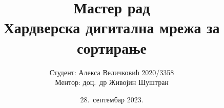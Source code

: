 
% 
% 

\documentclass{beamer}


\usepackage[utf8]{inputenc}
\usepackage[T1, T2A]{fontenc}
\usepackage[serbianc]{babel}
\usepackage{datetime}

\usepackage[labelformat=empty]{caption}
\usepackage{amsmath}
\usepackage{mathtools}
\DeclarePairedDelimiter\ceil{\lceil}{\rceil}
\DeclarePairedDelimiter\floor{\lfloor}{\rfloor}
\usepackage{float}
\usepackage{minted}
\usepackage{verbatim}
\usepackage{cite}



\hypersetup{
    colorlinks=true,
    linkcolor=black,
    citecolor=black,
    filecolor=magenta,
    urlcolor=cyan,
}
\makeatletter
\g@addto@macro\UrlBreaks{\do\-}
\makeatother



\title{\alert{Мастер рад}\\
Хардверска дигитална мрежа за сортирање}
\date{28.\ септембар 2023.}
\author{\alert{Студент: Алекса Величковић 2020/3358} \\
Ментор: доц.\ др Живојин Шуштран}

